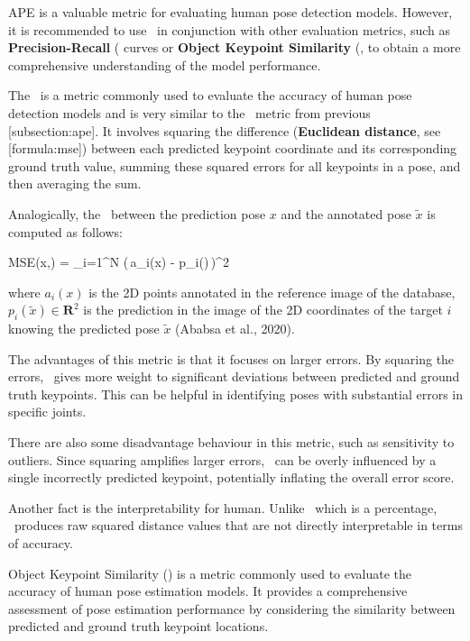 APE is a valuable metric for evaluating human pose detection models. However, it is recommended to use \APE\ in conjunction with other evaluation metrics, such as {\bf Precision-Recall} (\PR\) curves or {\bf Object Keypoint Similarity} (\OKS\), to obtain a more comprehensive understanding of the model performance.

The \MSE\ is a metric commonly used to evaluate the accuracy of human pose detection models and is very similar to the \APE\ metric from previous [subsection:ape]. It involves squaring the difference ({\bf Euclidean distance}, see [formula:mse]) between each predicted keypoint coordinate and its corresponding ground truth value, summing these squared errors for all keypoints in a pose, and then averaging the sum.

Analogically, the \MSE\ between the prediction pose $ x $ and the annotated pose $ \tilde{x}$ is computed as follows:

\startplaceformula[reference=formula:mse]
    \startformula MSE(x,) =  \sum_{i=1}^{N} (\,a_i(x) - p_i()\,)^{2}
    \stopformula
\stopplaceformula

where $ a_i (x) $ is the 2D points annotated in the reference image of the database, $ p_i (\tilde{x}) \in  \mathbf R^2 $ is the prediction in the image of the 2D coordinates of the target $ i $ knowing the predicted pose $ \tilde{x} $ (Ababsa et al., 2020).

The advantages of this metric is that it focuses on larger errors. By squaring the errors, \MSE\ gives more weight to significant deviations between predicted and ground truth keypoints. This can be helpful in identifying poses with substantial errors in specific joints.

There are also some disadvantage behaviour in this metric, such as sensitivity to outliers. Since squaring amplifies larger errors, \MSE\ can be overly influenced by a single incorrectly predicted keypoint, potentially inflating the overall error score.

Another fact is the interpretability for human. Unlike \APE\, which is a percentage, \MSE\ produces raw squared distance values that are not directly interpretable in terms of accuracy.

Object Keypoint Similarity (\OKS) is a metric commonly used to evaluate the accuracy of human pose estimation models. It provides a comprehensive assessment of pose estimation performance by considering the similarity between predicted and ground truth keypoint locations.

